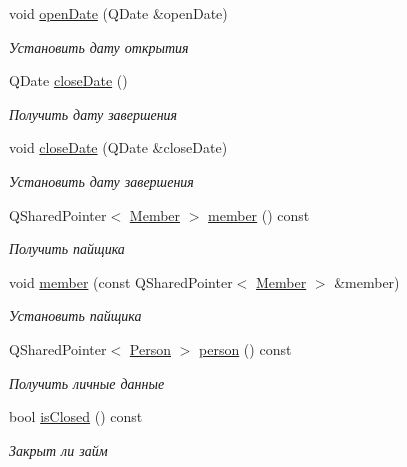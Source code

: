 \begin{DoxyCompactItemize}
void \hyperlink{classkpk_1_1data_1_1_loan_a46351e2f11a23a671e2a2d4be126eb2b}{open\+Date} (Q\+Date \&open\+Date)
\begin{DoxyCompactList}\small\item\em Установить дату открытия \end{DoxyCompactList}\item 
Q\+Date \hyperlink{classkpk_1_1data_1_1_loan_af8ccbb954480eae0aa3b2a6b2f39fcb5}{close\+Date} ()
\begin{DoxyCompactList}\small\item\em Получить дату завершения \end{DoxyCompactList}\item 
void \hyperlink{classkpk_1_1data_1_1_loan_ada266f079bcda1b9877ab161655c22e1}{close\+Date} (Q\+Date \&close\+Date)
\begin{DoxyCompactList}\small\item\em Установить дату завершения \end{DoxyCompactList}\item 
Q\+Shared\+Pointer$<$ \hyperlink{classkpk_1_1data_1_1_member}{Member} $>$ \hyperlink{classkpk_1_1data_1_1_loan_affe990a0811434de611bc365a377fc76}{member} () const 
\begin{DoxyCompactList}\small\item\em Получить пайщика \end{DoxyCompactList}\item 
void \hyperlink{classkpk_1_1data_1_1_loan_a658c2387c3619fef4b7cac20e23dbf59}{member} (const Q\+Shared\+Pointer$<$ \hyperlink{classkpk_1_1data_1_1_member}{Member} $>$ \&member)
\begin{DoxyCompactList}\small\item\em Установить пайщика \end{DoxyCompactList}\item 
Q\+Shared\+Pointer$<$ \hyperlink{classkpk_1_1data_1_1_person}{Person} $>$ \hyperlink{classkpk_1_1data_1_1_loan_a2b0d3e4f98779590faa7fd6bbd36e27e}{person} () const 
\begin{DoxyCompactList}\small\item\em Получить личные данные \end{DoxyCompactList}\item 
bool \hyperlink{classkpk_1_1data_1_1_loan_a70783859ac8c369fbacf45743b7dc527}{is\+Closed} () const 
\begin{DoxyCompactList}\small\item\em Закрыт ли займ \end{DoxyCompactList}\item 

\end{DoxyCompactItemize}
